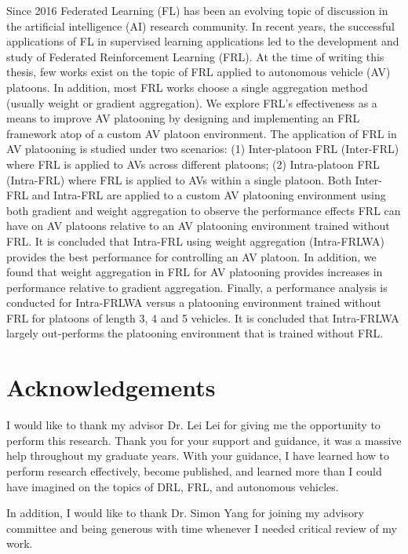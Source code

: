 \documentclass[oneside, 12pt]{book}
\begin{document}
Since 2016 Federated Learning (FL) has been an evolving topic of discussion in the artificial
intelligence (AI) research community.  In recent years, the successful applications of FL
in supervised learning applications led to the development and study of
Federated Reinforcement Learning (FRL).  At the time of writing this thesis,
few works exist on the topic of FRL applied to
autonomous vehicle (AV) platoons. In addition, most FRL works choose a single aggregation
method (usually weight or gradient aggregation). We explore FRL's effectiveness as a means
to improve AV platooning by designing and implementing an FRL framework atop of a custom
AV platoon environment.  The application of FRL in AV platooning is studied under two
scenarios: (1)  Inter-platoon FRL (Inter-FRL) where FRL is applied to AVs across different
platoons; (2) Intra-platoon FRL (Intra-FRL) where FRL is applied to AVs within a single
platoon. Both Inter-FRL and Intra-FRL are applied to a custom AV platooning environment using
both gradient and weight aggregation to observe the performance effects FRL can have on AV
platoons relative to an AV platooning environment trained without FRL.  It is concluded that
Intra-FRL using weight aggregation (Intra-FRLWA) provides the best performance for
controlling an AV platoon. In addition, we found that weight aggregation in FRL for
AV platooning provides increases in performance relative to gradient aggregation.
Finally, a performance analysis is conducted for Intra-FRLWA versus a platooning
environment trained without FRL for platoons of length 3, 4 and 5 vehicles. It is concluded
that Intra-FRLWA largely out-performs the platooning environment that is trained without FRL.

\chapter*{Acknowledgements}
I would like to thank my advisor Dr. Lei Lei for giving me the opportunity to perform this research.
Thank you for your support and guidance, it was a massive help throughout my graduate years.  With your guidance,
I have learned how to perform research effectively, become published, and learned more than I could have imagined on
the topics of DRL, FRL, and autonomous vehicles.

In addition, I would like to thank Dr. Simon Yang for joining my advisory committee and being
generous with time whenever I needed critical review of my work.

\tableofcontents
\listoftables
\listoffigures








\newpage


\end{document}
